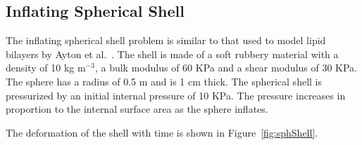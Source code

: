     \subsection{Inflating Spherical Shell}
    The inflating spherical shell problem is similar to that used to
    model lipid bilayers by Ayton et al.~\cite{Ayton2002}.  The shell is
    made of a soft rubbery material with a density of 10 kg m$^{-3}$,
    a bulk modulus of 60 KPa and a shear modulus of 30 KPa.  The sphere
    has a radius of 0.5 m and is 1 cm thick.  The spherical shell is
    pressurized by an initial internal pressure of 10 KPa.  The pressure 
    increases in proportion to the internal surface area as the sphere inflates.

    The deformation of the shell with time is shown in 
    Figure~\ref{fig:sphShell}.
    \begin{figure}[htpb!]
      \begin{center}

\end{center}
\end{figure}
